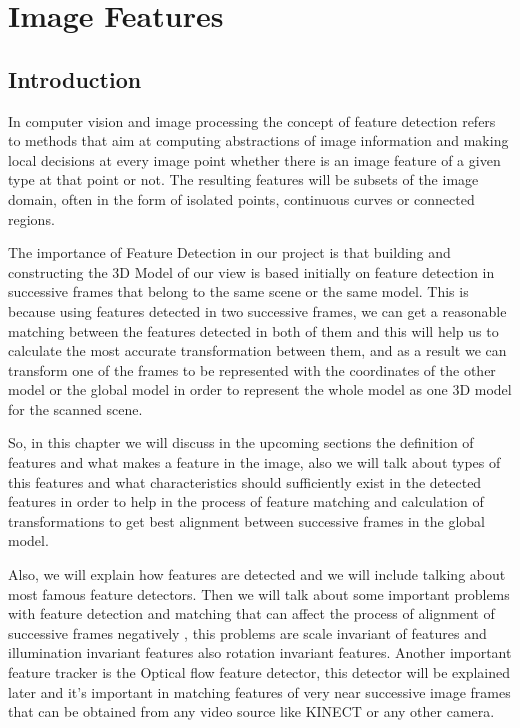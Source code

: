 \chapter{Image Features}
\usepackage{enumitem}
\section{Introduction}

In computer vision and image processing the concept of feature detection refers to methods that aim at computing abstractions of image information and making local decisions at every image point whether there is an image feature of a given type at that point or not. The resulting features will be subsets of the image domain, often in the form of isolated points, continuous curves or connected regions.

The importance of Feature Detection in our project is that building and constructing the 3D Model of our view is based initially on feature detection in successive frames that belong to the same scene or the same model. This is because using features detected in two successive frames, we can get a reasonable matching between the features detected in both of them and this will help us to calculate the most accurate transformation between them, and as a result we can transform one of the frames to be represented with the coordinates of the other model or the global model in order to represent the whole model as one 3D model for the scanned scene.

So, in this chapter we will discuss in the upcoming sections the definition of features and what makes a feature in the image, also we will talk about types of this features and what characteristics should sufficiently exist in the detected features in order to help in the process of feature matching and calculation of transformations to get best alignment between successive frames in the global model.

Also, we will explain how features are detected and we will include talking about most famous feature detectors. Then we will talk about some important problems with feature detection and matching that can affect the process of alignment of successive frames negatively , this problems are scale invariant of features and illumination invariant features also rotation invariant features. Another important feature tracker is the Optical flow feature detector, this detector will be explained later and it's important in matching features of very near successive image frames that can be obtained from any video source like KINECT or any other camera.



